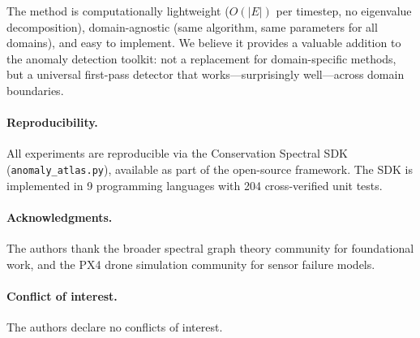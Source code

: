 \documentclass[11pt,a4paper]{article}
\begin{document}
The method is computationally lightweight ($O(|E|)$ per timestep, no eigenvalue
decomposition), domain-agnostic (same algorithm, same parameters for all
domains), and easy to implement.  We believe it provides a valuable
addition to the anomaly detection toolkit: not a replacement for domain-specific
methods, but a universal first-pass detector that works---surprisingly
well---across domain boundaries.

\paragraph{Reproducibility.} All experiments are reproducible via the
Conservation Spectral SDK (\texttt{anomaly\_atlas.py}), available as part of
the open-source framework.  The SDK is implemented in 9 programming languages
with 204 cross-verified unit tests.

\paragraph{Acknowledgments.} The authors thank the broader spectral graph
theory community for foundational work, and the PX4 drone simulation community
for sensor failure models.

\paragraph{Conflict of interest.} The authors declare no conflicts of interest.
\end{document}
